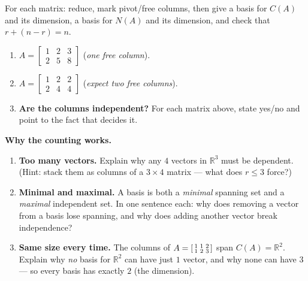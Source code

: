 \documentclass[10pt]{article}
\begin{document}
\begin{tcolorbox}[colback=white, colframe=black!40, title=\textbf{Tier A --- Approaching Proficiency},
    fonttitle=\bfseries, arc=1.5mm, left=3mm, right=3mm, top=2mm, bottom=2mm, breakable]
For each matrix: reduce, mark pivot/free columns, then give a basis for $C(A)$ and its dimension, a basis
for $N(A)$ and its dimension, and check that $r+(n-r)=n$.
\begin{enumerate}[leftmargin=1.7em, itemsep=9pt]
  \item $A=\begin{bmatrix} 1 & 2 & 3 \\ 2 & 5 & 8 \end{bmatrix}$ \quad (\emph{one free column}). 
  \item $A=\begin{bmatrix} 1 & 2 & 2 \\ 2 & 4 & 4 \end{bmatrix}$ \quad (\emph{expect two free columns}). 
  \item \textbf{Are the columns independent?} For each matrix above, state yes/no and point to the fact
        that decides it. 
\end{enumerate}
\end{tcolorbox}

\begin{tcolorbox}[colback=white, colframe=black!40, title=\textbf{Tier E --- Extension},
    fonttitle=\bfseries, arc=1.5mm, left=3mm, right=3mm, top=2mm, bottom=2mm, breakable]
\textbf{Why the counting works.}
\begin{enumerate}[leftmargin=1.7em, itemsep=9pt]
  \item \textbf{Too many vectors.} Explain why any $4$ vectors in $\mathbb{R}^3$ must be dependent. (Hint:
        stack them as columns of a $3\times4$ matrix --- what does $r\le 3$ force?) 
  \item \textbf{Minimal and maximal.} A basis is both a \emph{minimal} spanning set and a \emph{maximal}
        independent set. In one sentence each: why does removing a vector from a basis lose spanning, and
        why does adding another vector break independence? 
  \item \textbf{Same size every time.} The columns of $A=\begin{bsmallmatrix} 1&1&2\\1&2&3 \end{bsmallmatrix}$
        span $C(A)=\mathbb{R}^2$. Explain why \emph{no} basis for $\mathbb{R}^2$ can have just $1$ vector,
        and why none can have $3$ --- so every basis has exactly $2$ (the dimension). 
\end{enumerate}
\end{tcolorbox}
\end{document}
